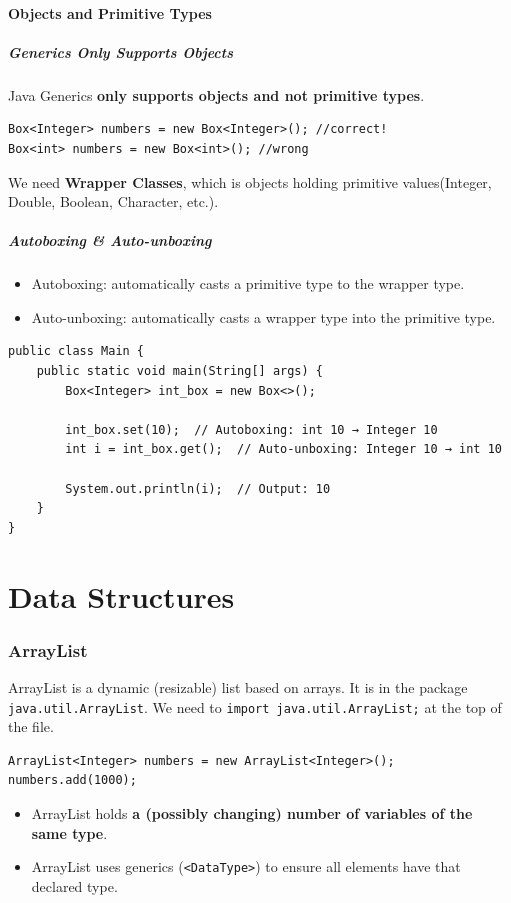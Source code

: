 \documentclass[letterpaper,12pt]{article}
\begin{document}
\subsection{Objects and Primitive Types}
\subsubsection{Generics Only Supports Objects}
Java Generics \textbf{only supports objects and not primitive types}.
\begin{verbatim}
Box<Integer> numbers = new Box<Integer>(); //correct!
Box<int> numbers = new Box<int>(); //wrong
\end{verbatim}
We need \textbf{Wrapper Classes}, which is objects holding primitive values(Integer, Double, Boolean, Character, etc.).
\subsubsection{Autoboxing \& Auto-unboxing}
\begin{itemize}
    \item Autoboxing: automatically casts a primitive type to the wrapper type.
    \item Auto-unboxing: automatically casts a wrapper type into the primitive type.
\end{itemize}
\begin{verbatim}
public class Main {
    public static void main(String[] args) {
        Box<Integer> int_box = new Box<>();
        
        int_box.set(10);  // Autoboxing: int 10 → Integer 10
        int i = int_box.get();  // Auto-unboxing: Integer 10 → int 10
        
        System.out.println(i);  // Output: 10
    }
}
\end{verbatim}

\part{Data Structures}

\section{ArrayList}
ArrayList is a dynamic (resizable) list based on arrays. It is in the package \texttt{java.util.\allowbreak ArrayList}. We need to \texttt{import java.util.\allowbreak ArrayList;} at the top of the file.
\begin{verbatim}
ArrayList<Integer> numbers = new ArrayList<Integer>();
numbers.add(1000);
\end{verbatim}
\begin{itemize}
    \item ArrayList holds \textbf{a (possibly changing) number of variables of the same type}.
    \item ArrayList uses generics (\texttt{<DataType>}) to ensure all elements have that declared type.
\end{itemize}
\end{document}
